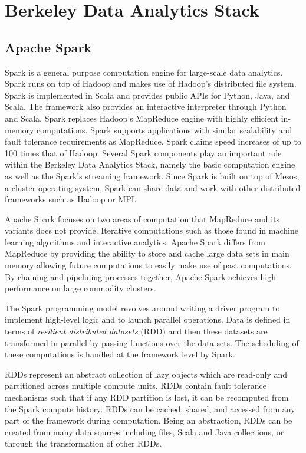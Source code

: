 \section{Berkeley Data Analytics Stack}
\subsection{Apache Spark}
Spark \cite{zaharia2010spark} is a general purpose computation engine for large-scale data analytics. Spark runs on top of Hadoop and makes use of Hadoop's distributed file system. Spark is implemented in Scala and provides public APIs for Python, Java, and Scala. The framework also provides an interactive interpreter through Python and Scala. Spark replaces Hadoop's MapReduce engine with highly efficient in-memory computations. Spark supports applications with similar scalability and fault tolerance requirements as MapReduce. Spark claims speed increases of up to 100 times that of Hadoop. Several Spark components play an important role within the Berkeley Data Analytics Stack, namely the basic computation engine as well as the Spark's streaming framework. Since Spark is built on top of Mesos, a cluster operating system, Spark can share data and work with other distributed frameworks such as Hadoop or MPI.

Apache Spark focuses on two areas of computation that MapReduce and its variants does not provide. Iterative computations such as those found in machine learning algorithms and interactive analytics. Apache Spark differs from MapReduce by providing the ability to store and cache large data sets in main memory allowing future computations to easily make use of past computations. By chaining and pipelining processes together, Apache Spark achieves high performance on large commodity clusters.

The Spark programming model revolves around writing a driver program to implement high-level logic and to launch parallel operations. Data is defined in terms of \textit{resilient distributed datasets} (RDD) and then these datasets are transformed in parallel by passing functions over the data sets. The scheduling of these computations is handled at the framework level by Spark.

RDDs represent an abstract collection of lazy objects which are read-only and partitioned across multiple compute units. RDDs contain fault tolerance mechanisms such that if any RDD partition is lost, it can be recomputed from the Spark compute history. RDDs can be cached, shared, and accessed from any part of the framework during computation. Being an abstraction, RDDs can be created from many data sources including files, Scala and Java collections, or through the transformation of other RDDs.

